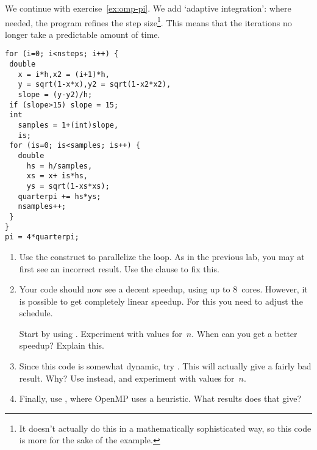 \begin{exercise}
  \label{ex:omp-pi-adapt}
  We continue with exercise~\ref{ex:omp-pi}.  We add `adaptive
  integration': where needed, the program refines the step
  size\footnote{It doesn't actually do this in a mathematically
    sophisticated way, so this code is more for the sake of the
    example.}.  This means that the iterations no longer take a
  predictable amount of time.

\begin{minipage}{.3\linewidth}\small
\begin{verbatim}
for (i=0; i<nsteps; i++) {
 double
   x = i*h,x2 = (i+1)*h,
   y = sqrt(1-x*x),y2 = sqrt(1-x2*x2),
   slope = (y-y2)/h;
 if (slope>15) slope = 15;
 int
   samples = 1+(int)slope,
   is;
 for (is=0; is<samples; is++) {
   double
     hs = h/samples,
     xs = x+ is*hs,
     ys = sqrt(1-xs*xs);
   quarterpi += hs*ys;
   nsamples++;
 }
}
pi = 4*quarterpi;
\end{verbatim}
\end{minipage}

\begin{enumerate}
\item Use the  construct to parallelize the loop.
  As in the previous lab, you may at first see an incorrect result.
  Use the  clause to fix this.
\item Your code should now see a decent speedup, using up to 8~cores.
  However, it is possible to get completely linear speedup. For this
  you need to adjust the schedule.

  Start by using . Experiment with values
  for~$n$.  When can you get a better speedup? Explain this.
\item Since this code is somewhat dynamic, try .
  This will actually give a fairly bad result. Why?  Use
   instead, and experiment with values
  for~$n$.
\item Finally, use , where OpenMP uses a
  heuristic.  What results does that give?
\end{enumerate}
     
\end{exercise}


